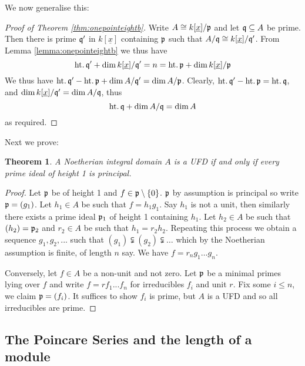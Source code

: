 \documentclass[12pt]{article}
\theoremstyle{plain}
\newtheorem{thm}{Theorem}[subsection] %
\theoremstyle{definition}
\begin{document}
We now generalise this:
\begin{proof}[Proof of Theorem \ref{thm:onepointeightb}]
Write $A \cong k[\underline{x}]/\frak{p}$ and let $\frak{q} \subseteq A$ be prime. Then there is prime $\frak{q}'$ in $k[\underline{x}]$ containing $\frak{p}$ such that $A/\frak{q} \cong k[\underline{x}]/\frak{q}'$. From Lemma \ref{lemma:onepointeightb} we thus have
\[\operatorname{ht.}\frak{q}' + \operatorname{dim}k[\underline{x}]/\frak{q}' = n = \operatorname{ht.}\frak{p} + \operatorname{dim}k[\underline{x}]/\frak{p}\]
We thus have $\operatorname{ht.}\frak{q}' - \operatorname{ht.}\frak{p} + \operatorname{dim}A/\frak{q}' = \operatorname{dim}A/\frak{p}$. Clearly, $\operatorname{ht.}\frak{q}' - \operatorname{ht.}\frak{p} = \operatorname{ht.}\frak{q}$, and $\operatorname{dim}k[\underline{x}]/\frak{q}' = \operatorname{dim}A/\frak{q}$, thus
\[\operatorname{ht.}\frak{q} + \operatorname{dim}A/\frak{q} = \operatorname{dim}A\]
as required.
\end{proof}
Next we prove:
\begin{thm}
\label{thm:onepointonetwoa}
A Noetherian integral domain $A$ is a UFD if and only if every prime ideal of height 1 is principal.
\end{thm}
\begin{proof}
Let $\frak{p}$ be of height 1 and $f \in \frak{p}\setminus\lbrace 0\rbrace$. $\frak{p}$ by assumption is principal so write $\frak{p} = (g_1)$. Let $h_1 \in A$ be such that $f = h_1g_1$. Say $h_1$ is not a unit, then similarly there exists a prime ideal $\frak{p}_1$ of height 1 containing $h_1$. Let $h_2 \in A$ be such that $(h_2) = \frak{p}_2$ and $r_2 \in A$ be such that $h_1 = r_2h_2$. Repeating this process we obtain a sequence $g_1,g_2,...$ such that $(g_1) \subsetneqq (g_2) \subsetneqq \hdots$ which by the Noetherian assumption is finite, of length $n$ say. We have $f = r_n g_1\hdots g_n$.

Conversely, let $f \in A$ be a non-unit and not zero. Let $\frak{p}$ be a minimal primes lying over $f$ and write $f =rf_1...f_n$ for irreducibles $f_i$ and unit $r$. Fix some $i \leq n$, we claim $\frak{p} = (f_i)$. It suffices to show $f_i$ is prime, but $A$ is a UFD and so all irreducibles are prime.
\end{proof}

\subsection{The Poincare Series and the length of a module}
\end{document}
